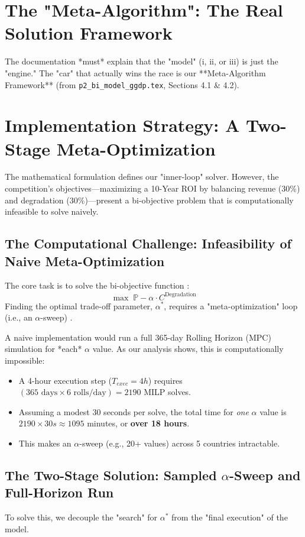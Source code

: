 \documentclass[11pt, a4paper]{article}
\begin{document}
\section{The "Meta-Algorithm": The Real Solution Framework}
The documentation *must* explain that the "model" (i, ii, or iii) is just the "engine." The "car" that actually wins the race is our **Meta-Algorithm Framework** (from \texttt{p2\_bi\_model\_ggdp.tex}, Sections 4.1 \& 4.2).

\section{Implementation Strategy: A Two-Stage Meta-Optimization}
The mathematical formulation defines our "inner-loop" solver. However, the competition's objectives---maximizing a 10-Year ROI by balancing revenue (30\%) and degradation (30\%)---present a bi-objective problem that is computationally infeasible to solve naively.

\subsection{The Computational Challenge: Infeasibility of Naive Meta-Optimization}
The core task is to solve the bi-objective function \cite{huawei2025}:
$$ \max \; \mathbb{P} - \alpha \cdot C^{\mathrm{Degradation}} $$
Finding the optimal trade-off parameter, $\alpha^*$, requires a "meta-optimization" loop (i.e., an $\alpha$-sweep) \cite{828-834}.

A naive implementation would run a full 365-day Rolling Horizon (MPC) simulation for *each* $\alpha$ value. As our analysis shows, this is computationally impossible:
\begin{itemize}
    \item A 4-hour execution step ($T_{exec}=4h$) requires $(365 \text{ days} \times 6 \text{ rolls/day}) = 2190$ MILP solves.
    \item Assuming a modest 30 seconds per solve, the total time for \emph{one} $\alpha$ value is $2190 \times 30s \approx 1095$ minutes, or \textbf{over 18 hours}.
    \item This makes an $\alpha$-sweep (e.g., 20+ values) across 5 countries intractable.
\end{itemize}

\subsection{The Two-Stage Solution: Sampled $\alpha$-Sweep and Full-Horizon Run}
To solve this, we decouple the "search" for $\alpha^*$ from the "final execution" of the model.
\end{document}
